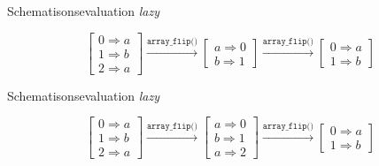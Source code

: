 \begin{frame}{Schematisons}{evaluation \textit{lazy}}
    \begin{center}
            \[
            \left[ \begin{array}{tt}
                0 \Rightarrow a \\
                1 \Rightarrow b \\
                2 \Rightarrow a
            \end{array} \right]
            \xrightarrow{\texttt{array\_flip()}}
            \left[ \begin{array}{tt}
                a \Rightarrow 0 \\
                b \Rightarrow 1
            \end{array} \right]
            \xrightarrow{\texttt{array\_flip()}}
            \left[ \begin{array}{tt}
                0 \Rightarrow a \\
                1 \Rightarrow b
            \end{array} \right]
            \]%
    \end{center}
\end{frame}

\begin{frame}{Schematisons}{evaluation \textit{lazy}}
    \begin{center}
            \[
            \left[ \begin{array}{tt}
                0 \Rightarrow a \\
                1 \Rightarrow b \\
                2 \Rightarrow a
            \end{array} \right]
            \xrightarrow{\texttt{array\_flip()}}
            \left[ \begin{array}{tt}
                a \Rightarrow 0 \\
                b \Rightarrow 1 \\
                a \Rightarrow 2
            \end{array} \right]
            \xrightarrow{\texttt{array\_flip()}}
            \left[ \begin{array}{tt}
                0 \Rightarrow a \\
                1 \Rightarrow b
            \end{array} \right]
            \]%
    \end{center}
\end{frame}

